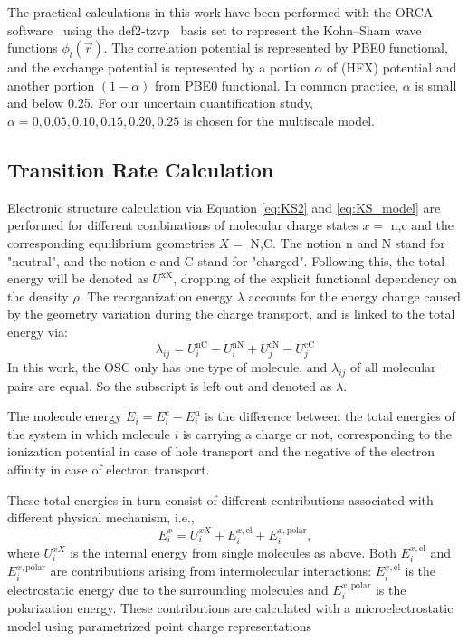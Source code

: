 \documentclass[%
 reprint,
superscriptaddress,
 amsmath,amssymb,
 aps,
prb,
floatfix
]{revtex4-2}
\begin{document}
The practical calculations in this work have been performed with the ORCA software~\cite{Neese2012a} using the def2-tzvp~\cite{weigend_accurate_2006} basis set to represent the Kohn--Sham wave functions $\phi_l(\vec{r})$. 
The correlation potential is represented by PBE0 functional, and the exchange potential is represented by a portion $\alpha$ of (HFX) potential and another portion $(1-\alpha)$ from PBE0 functional. In common practice, $\alpha$ is small and below 0.25. For our uncertain quantification study, $\alpha=0,0.05,0.10,0.15,0.20,0.25$ is chosen for the multiscale model.

\subsection{Transition Rate Calculation}
Electronic structure calculation via Equation \ref{eq:KS2} and \ref{eq:KS_model} are performed for different combinations of molecular charge states $x=$ n,c and the corresponding equilibrium geometries $X=$ N,C. The notion n and N stand for "neutral", and the notion c and C stand for "charged". 
Following this, the total energy will be denoted as $U^\text{xX}$, dropping of the explicit functional dependency on the density $\rho$. 
The reorganization energy $\lambda$ accounts for the energy change caused by the geometry variation during the charge transport, and is linked to the total energy via:
%
\begin{equation}
    \lambda_{ij} = U_i^\text{nC} - U_i^\text{nN} + U_j^\text{cN} - U_j^\text{cC}
    \label{eq:lambda}
\end{equation}
%
In this work, the OSC only has one type of molecule, and $\lambda_{ij}$ of all molecular pairs are equal. So the subscript is left out and denoted as $\lambda$.

The molecule energy $E_i = E_i^\text{c} - E_i^\text{n}$ is the difference between the total energies of the system in which molecule $i$ is carrying a charge or not, corresponding to the ionization potential in case of hole transport and the negative of the electron affinity in case of electron transport. 

These total energies in turn consist of different contributions associated with different physical mechanism, i.e.,
%
\begin{equation}
E_i^x = U_i^{xX} + E_i^{x,\text{el}} + E_i^{x,\text{polar}},
\label{eq:Es}
\end{equation}
%
where $U_i^{xX}$ is the internal energy from single molecules as above.
Both $E_i^{x,\text{el}}$ and $E_i^{x,\text{polar}}$ are contributions arising from intermolecular interactions: $E_i^{x,\text{el}}$ is the electrostatic energy due to the surrounding molecules and $E_i^{x,\text{polar}}$ is the polarization energy. 
These contributions are calculated with a microelectrostatic model using parametrized point charge representations\cite{https://doi.org/10.1002/jcc.540110311}
\end{document}
